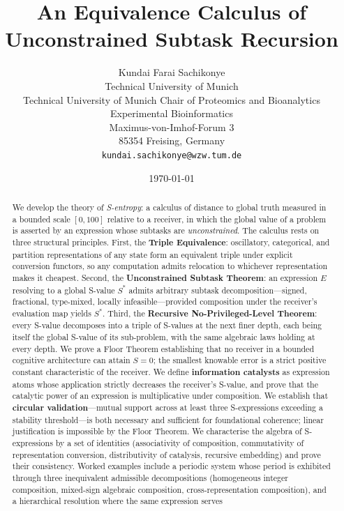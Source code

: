\documentclass[twocolumn,11pt,a4paper]{article}
\title{\Large\textbf{An Equivalence Calculus of\\
Unconstrained Subtask Recursion}}
\author{
Kundai Farai Sachikonye\\
Technical University of Munich\\
Technical University of Munich Chair of Proteomics and Bioanalytics \\
Experimental Bioinformatics \\
Maximus-von-Imhof-Forum 3\\
85354 Freising, Germany\\
\texttt{kundai.sachikonye@wzw.tum.de}
}
\date{\today}
\theoremstyle{thmstyle}
\theoremstyle{thmstyle}
\theoremstyle{definition}
\theoremstyle{remark}
\newcommand{\Sscalar}{S}
\begin{document}
\maketitle

\begin{abstract}
We develop the theory of \emph{S-entropy}: a calculus of
distance to global truth measured in a bounded scale $[0,100]$
relative to a receiver, in which the global value of a problem
is asserted by an expression whose subtasks are \emph{unconstrained}.
The calculus rests on three structural principles. First, the
\textbf{Triple Equivalence}: oscillatory, categorical, and
partition representations of any state form an equivalent
triple under explicit conversion functors, so any computation
admits relocation to whichever representation makes it cheapest.
Second, the \textbf{Unconstrained Subtask Theorem}: an expression
$E$ resolving to a global S-value $\Sscalar^{*}$ admits arbitrary
subtask decomposition---signed, fractional, type-mixed,
locally infeasible---provided composition under the receiver's
evaluation map yields $\Sscalar^{*}$. Third, the
\textbf{Recursive No-Privileged-Level Theorem}: every S-value
decomposes into a triple of S-values at the next finer depth,
each being itself the global S-value of its sub-problem,
with the same algebraic laws holding at every depth. We
prove a Floor Theorem establishing that no receiver in a
bounded cognitive architecture can attain $\Sscalar = 0$;
the smallest knowable error is a strict positive constant
characteristic of the receiver. We define
\textbf{information catalysts} as expression atoms whose
application strictly decreases the receiver's S-value,
and prove that the catalytic power of an expression is
multiplicative under composition. We establish that
\textbf{circular validation}---mutual support across at
least three S-expressions exceeding a stability threshold---is
both necessary and sufficient for foundational coherence;
linear justification is impossible by the Floor Theorem.
We characterise the algebra of S-expressions by a set
of identities (associativity of composition, commutativity
of representation conversion, distributivity of catalysis,
recursive embedding) and prove their consistency. Worked
examples include a periodic system whose period is exhibited
through three inequivalent admissible decompositions
(homogeneous integer composition, mixed-sign algebraic
composition, cross-representation composition), and a
hierarchical resolution where the same expression serves

\end{abstract}
\end{document}
